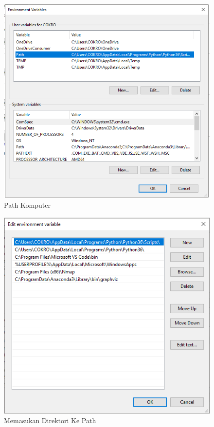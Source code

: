 \begin{enumerate}
\begin{figure}[ht]
      \centerline{\includegraphics[width=1\textwidth]
      {figures/cokro/c34}}
      \caption{Path Komputer}
      \label{c34}
     \end{figure}

\begin{figure}[ht]
      \centerline{\includegraphics[width=1\textwidth]
      {figures/cokro/c35}}
      \caption{Memasukan Direktori Ke Path }
      \label{c35}
     \end{figure}


\end{enumerate}

